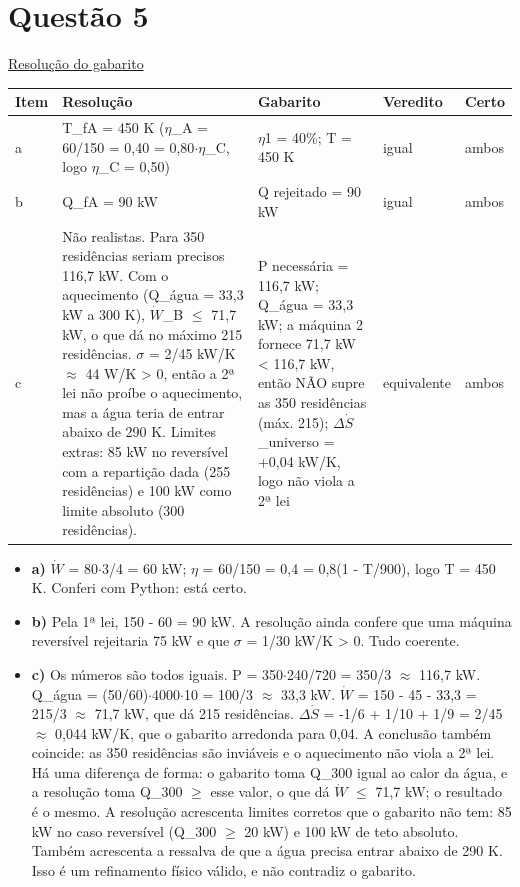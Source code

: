 \documentclass{article}%
\begin{document}
\section*{Questão 5}%
\href{https://poliedroresolve.sistemapoliedro.com.br/vestibulares/ime/2027/ime-2-fase-dia-2-27-10-2026-2-fase-dia-2/dissertativa-5-fisica-2-fase-dia-2-ime-2027}{Resolução do gabarito}\par\smallskip%
\begin{longtable}{@{}p{} p{} p{} p{} p{}@{}}\toprule Item & Resolução & Gabarito & Veredito & Certo \\ \midrule
a & T\_fA = 450 K ($\eta$\_A = 60/150 = 0,40 = 0,80$\cdot$$\eta$\_C, logo $\eta$\_C = 0,50) & $\eta$1 = 40\%; T = 450 K & igual & ambos \\
b & Q\_fA = 90 kW & Q rejeitado = 90 kW & igual & ambos \\
c & Não realistas. Para 350 residências seriam precisos 116,7 kW. Com o aquecimento (Q\_água = 33,3 kW a 300 K), $\dot W$\_B $\leq$ 71,7 kW, o que dá no máximo 215 residências. $\sigma$ = 2/45 kW/K $\approx$ 44 W/K > 0, então a 2ª lei não proíbe o aquecimento, mas a água teria de entrar abaixo de 290 K. Limites extras: 85 kW no reversível com a repartição dada (255 residências) e 100 kW como limite absoluto (300 residências). & P necessária = 116,7 kW; Q\_água = 33,3 kW; a máquina 2 fornece 71,7 kW < 116,7 kW, então NÃO supre as 350 residências (máx. 215); $\Delta$$\dot S$\_universo = +0,04 kW/K, logo não viola a 2ª lei & equivalente & ambos \\
\bottomrule\end{longtable}%
\begin{itemize}%
\item%
\textbf{a)} $\dot W$ = 80$\cdot$3/4 = 60 kW; $\eta$ = 60/150 = 0,4 = 0,8(1 - T/900), logo T = 450 K. Conferi com Python: está certo.%
\item%
\textbf{b)} Pela 1ª lei, 150 - 60 = 90 kW. A resolução ainda confere que uma máquina reversível rejeitaria 75 kW e que $\sigma$ = 1/30 kW/K > 0. Tudo coerente.%
\item%
\textbf{c)} Os números são todos iguais. P = 350$\cdot$240/720 = 350/3 $\approx$ 116,7 kW. Q\_água = (50/60)$\cdot$4000$\cdot$10 = 100/3 $\approx$ 33,3 kW. $\dot W$ = 150 - 45 - 33,3 = 215/3 $\approx$ 71,7 kW, que dá 215 residências. $\Delta$$\dot S$ = -1/6 + 1/10 + 1/9 = 2/45 $\approx$ 0,044 kW/K, que o gabarito arredonda para 0,04. A conclusão também coincide: as 350 residências são inviáveis e o aquecimento não viola a 2ª lei. Há uma diferença de forma: o gabarito toma Q\_300 igual ao calor da água, e a resolução toma Q\_300 $\geq$ esse valor, o que dá $\dot W$ $\leq$ 71,7 kW; o resultado é o mesmo. A resolução acrescenta limites corretos que o gabarito não tem: 85 kW no caso reversível (Q\_300 $\geq$ 20 kW) e 100 kW de teto absoluto. Também acrescenta a ressalva de que a água precisa entrar abaixo de 290 K. Isso é um refinamento físico válido, e não contradiz o gabarito.%
\end{itemize}%
\end{document}
